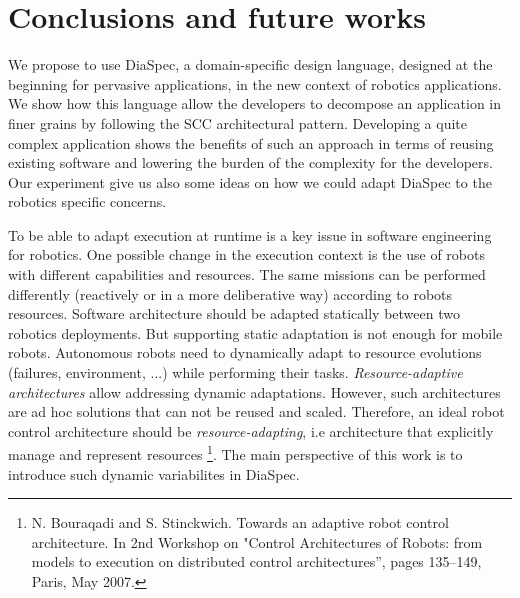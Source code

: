 
\section{Conclusions and future works}
\label{sec:conclusion}

We propose to use DiaSpec, a domain-specific design language, designed at the beginning for pervasive applications, in the new context of robotics applications. We show how this language allow the developers to decompose an application in finer grains by following the SCC architectural pattern.
Developing a quite complex application shows the benefits of such an approach in terms of reusing existing software and lowering the burden of the complexity for the developers. Our experiment give us also some ideas on how we could adapt DiaSpec to the robotics specific concerns.

To be able to adapt execution at runtime is a key issue in software engineering for robotics. One possible change in the execution context is the use of robots with different capabilities and resources. The same missions can be performed differently (reactively or in a more deliberative way) according to robots resources. Software architecture should be adapted statically between two robotics deployments.
But supporting static adaptation is not enough for mobile robots. Autonomous robots need to dynamically adapt to resource evolutions (failures, environment, ...) while performing their tasks. \emph{Resource-adaptive architectures} allow addressing dynamic adaptations. However, such architectures are ad hoc solutions that can not be reused and scaled. Therefore, an ideal robot control architecture should be \emph{resource-adapting}, i.e architecture that explicitly manage and represent resources \footnote{N. Bouraqadi and S. Stinckwich. Towards an adaptive robot control architecture. In 2nd Workshop on "Control Architectures of Robots: from models to execution on distributed control architectures”, pages 135–149, Paris, May 2007.}. The main perspective of this work is to introduce such dynamic variabilites in DiaSpec.